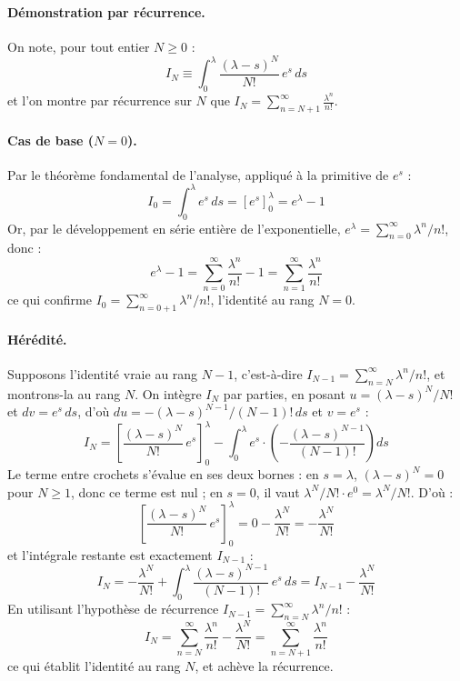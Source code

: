 \documentclass{article}
\begin{document}
\paragraph{Démonstration par récurrence.} On note, pour tout entier $N \geq 0$ :
\begin{equation}
I_N \equiv \int_0^\lambda \frac{(\lambda-s)^N}{N!}\, e^s\, ds
\end{equation}
et l'on montre par récurrence sur $N$ que $I_N = \displaystyle\sum_{n=N+1}^{\infty} \frac{\lambda^n}{n!}$.
\paragraph{Cas de base ($N=0$).} Par le théorème fondamental de l'analyse, appliqué à la primitive de $e^s$ :
\begin{equation}
I_0 = \int_0^\lambda e^s\, ds = \left[e^s\right]_0^\lambda = e^\lambda - 1
\end{equation}
Or, par le développement en série entière de l'exponentielle, $e^\lambda = \sum_{n=0}^{\infty} \lambda^n/n!$, donc :
\begin{equation}
e^\lambda - 1 = \sum_{n=0}^{\infty} \frac{\lambda^n}{n!} - 1 = \sum_{n=1}^{\infty} \frac{\lambda^n}{n!}
\end{equation}
ce qui confirme $I_0 = \sum_{n=0+1}^{\infty} \lambda^n/n!$, l'identité au rang $N=0$.
\paragraph{Hérédité.} Supposons l'identité vraie au rang $N-1$, c'est-à-dire $I_{N-1} = \sum_{n=N}^{\infty} \lambda^n/n!$, et montrons-la au rang $N$. On intègre $I_N$ par parties, en posant $u=(\lambda-s)^N/N!$ et $dv=e^s\,ds$, d'où $du = -(\lambda-s)^{N-1}/(N-1)!\,ds$ et $v=e^s$ :
\begin{equation}
I_N = \left[\frac{(\lambda-s)^N}{N!}\, e^s\right]_0^\lambda - \int_0^\lambda e^s \cdot \left(-\frac{(\lambda-s)^{N-1}}{(N-1)!}\right) ds
\end{equation}
Le terme entre crochets s'évalue en ses deux bornes : en $s=\lambda$, $(\lambda-s)^N=0$ pour $N\geq 1$, donc ce terme est nul ; en $s=0$, il vaut $\lambda^N/N! \cdot e^0 = \lambda^N/N!$. D'où :
\begin{equation}
\left[\frac{(\lambda-s)^N}{N!}\, e^s\right]_0^\lambda = 0 - \frac{\lambda^N}{N!} = -\frac{\lambda^N}{N!}
\end{equation}
et l'intégrale restante est exactement $I_{N-1}$ :
\begin{equation}
I_N = -\frac{\lambda^N}{N!} + \int_0^\lambda \frac{(\lambda-s)^{N-1}}{(N-1)!}\, e^s\, ds = I_{N-1} - \frac{\lambda^N}{N!}
\end{equation}
En utilisant l'hypothèse de récurrence $I_{N-1} = \sum_{n=N}^{\infty} \lambda^n/n!$ :
\begin{equation}
I_N = \sum_{n=N}^{\infty} \frac{\lambda^n}{n!} - \frac{\lambda^N}{N!} = \sum_{n=N+1}^{\infty} \frac{\lambda^n}{n!}
\end{equation}
ce qui établit l'identité au rang $N$, et achève la récurrence.
\end{document}
